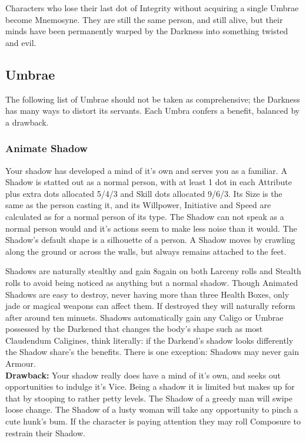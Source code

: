 Characters who lose their last dot of Integrity without acquiring a single Umbrae become Mnemosyne. They are still the same person, and still alive, but their minds have been permanently warped by the Darkness into something twisted and evil. 

\subsection*{Umbrae}
The following list of Umbrae should not be taken as comprehensive; the Darkness has many ways to distort its servants. Each Umbra confers a benefit, balanced by a drawback. 

\subsubsection*{Animate Shadow}
Your shadow has developed a mind of it's own and serves you as a familiar. A Shadow is statted out as a normal person, with at least 1 dot in each Attribute plus extra dots allocated 5/4/3 and Skill dots allocated 9/6/3. Its Size is the same as the person casting it, and its Willpower, Initiative and Speed are calculated as for a normal person of its type. The Shadow can not speak as a normal person would and it's actions seem to make less noise than it would. The Shadow's default shape is a silhouette of a person. A Shadow moves by crawling along the ground or across the walls, but always remains attached to the feet.

Shadows are naturally stealthy and gain 8again on both Larceny rolls and Stealth rolls to avoid being noticed as anything but a normal shadow. Though Animated Shadows are easy to destroy, never having more than three Health Boxes, only jade or magical weapons can affect them. If destroyed they will naturally reform after around ten minuets. Shadows automatically gain any Caligo or Umbrae possessed by the Darkened that changes the body's shape such as most Claudendum Caligines, think literally: if the Darkend's shadow looks differently the Shadow share's the benefits. There is one exception: Shadows may never gain Armour. \\

\noindent \textbf{Drawback:} Your shadow really does have a mind of it's own, and seeks out opportunities to indulge it's Vice. Being a shadow it is limited but makes up for that by stooping to rather petty levels. The Shadow of a greedy man will swipe loose change. The Shadow of a lusty woman will take any opportunity to pinch a cute hunk's bum. If the character is paying attention they may roll Composure to restrain their Shadow. 

